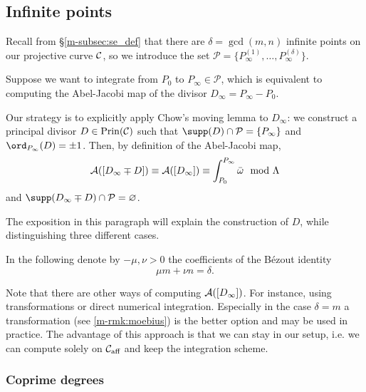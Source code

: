 \documentclass[main.tex]{subfiles}
\begin{document}
  
  
  \subsection{Infinite points}\label{subsec:ajm_infty}

  Recall from \S \ref{m-subsec:se_def} that there are $\delta = \gcd(m,n)$ infinite points on our projective curve $\mathcal{C}$, so
  we introduce the set $\mathcal{P}
  = \{ P_{\infty}^{(1)},\dots, P_{\infty}^{(\delta)} \}$.
  
  
  Suppose we want to integrate from $P_0$ to $P_{\infty} \in \mathcal{P}$, which is equivalent to computing the Abel-Jacobi map of the divisor
  $D_{\infty} = P_{\infty} - P_0$.

  Our strategy is to explicitly apply Chow's moving lemma to $D_{\infty}$: we construct a principal divisor $D \in \operatorname{Prin}(\mathcal{C})$ such that $\supp(D) \cap \mathcal{P} = \{ P_{\infty} \}$
  and $\ord_{P_{\infty}}(D) = \pm 1$. Then, by definition of the Abel-Jacobi map,
  \begin{equation*}
  \mathcal{A}([D_{\infty} \mp D]) \equiv \mathcal{A}([D_{\infty}]) \equiv \int_{P_0}^{P_{\infty}} \bar{\omega} \mod \Lambda
  \end{equation*}
  and $\supp(D_{\infty} \mp D) \cap \mathcal{P} = \varnothing$.
  
  The exposition in this paragraph will explain the construction of $D$, while distinguishing three different cases.
  
  In the following denote by  $-\mu,\nu > 0$ the coefficients of the Bézout identity
  \begin{equation*}
    \mu m + \nu n = \delta.
  \end{equation*}
  
  \begin{rmk}
   Note that there are other ways of computing $\mathcal{A}([D_{\infty}])$. For instance, using transformations or direct numerical
   integration. Especially in the case $\delta = m$ a transformation (see \ref{m-rmk:moebius}) is the better option and may be used in practice.
   The advantage of this approach is that we can stay in our setup, i.e. we can compute solely on $\mathcal{C}_{\text{aff}}$ and
   keep the integration scheme.
  \end{rmk}

  
  
  \subsubsection{Coprime degrees}\label{subsec:ajm_inf_cop}
  
\end{document}
